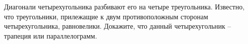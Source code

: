 \begin{ex}
	\begin{condition}
		Диагонали четырехугольника разбивают его на четыре треугольника. Известно, что треугольники, прилежащие к двум противоположным сторонам четырехугольника, равновелики. Докажите, что данный четырехугольник – трапеция или параллелограмм.
	\end{condition}
\end{ex}